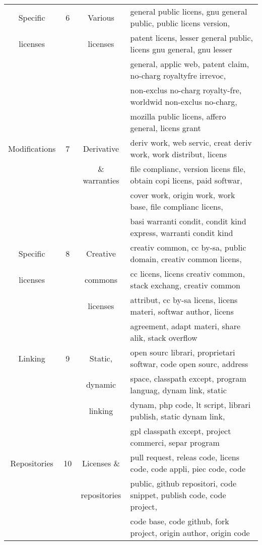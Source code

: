 \begin{table}
\begin{adjustbox}{width=0.99\textwidth}
\begin{tabular}{cccl}
\hline
Specific & 6& Various &
general public licens, 
gnu general public, 
public licens version,
\\
licenses && licenses &
patent licens,
lesser general public,
licens gnu general, 
gnu lesser 
\\
&&&general, 
applic web, 
patent claim, 
no-charg royaltyfre irrevoc, 
\\
&&&non-exclus no-charg royalty-fre, 
worldwid non-exclus no-charg, 
\\
&&&mozilla public licens,
affero general, 
licens grant
\\

\hline
Modifications& 7& Derivative&
deriv work, 
web servic, 
creat deriv work, 
work distribut, licens\\
&& \& warranties &
file complianc, 
version licens file, 
obtain copi licens, 
paid softwar, \\
&&&
cover work, 
origin work, 
work base, 
file complianc licens, \\
&&&basi warranti condit, 
condit kind express, 
warranti condit kind
\\

\hline
Specific & 8& Creative &
creativ common, 
cc by-sa, 
public domain, 
creativ common licens, \\
licenses && commons &
cc licens, 
licens creativ common, 
stack exchang, 
creativ common  \\
&&licenses&
attribut,
cc by-sa licens, 
licens materi, 
softwar author, 
licens \\
&&&
agreement, 
adapt materi, 
share alik, 
stack overflow
\\

\hline
Linking& 9& Static, &
open sourc librari, 
proprietari softwar, 
code open sourc, 
address \\
&&dynamic&
space, 
classpath except, 
program languag, 
dynam link, 
static 
\\
&& linking &
dynam, 
php code,
lt script, 
librari publish, 
static dynam link, \\
&&&
gpl classpath except,
project commerci, 
separ program
\\

\hline
Repositories& 10& Licenses \&&
pull request, 
releas code, 
licens code, 
code appli, 
piec code, 
code \\
&&  repositories&
public, 
github repositori, 
code snippet, 
publish code,
code project,\\
&&& 
code base, 
code github, 
fork project, 
origin author,
origin code
\\


\end{tabular}
\end{adjustbox}
\end{table}
